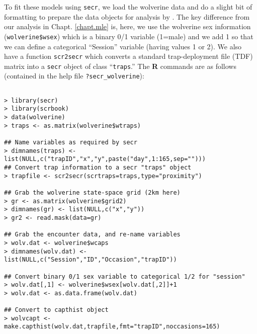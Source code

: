 To fit these models using \mbox{\tt secr}, 
we load the wolverine data and do 
a slight bit of formatting to prepare the data objects for analysis by
\mbox{\secr}. The key difference from our analysis in
Chapt. \ref{chapt.mle} is, here, we use the wolverine sex information
(\mbox{\tt wolverine\$wsex}) which is a binary 0/1 variable (1=male) 
and we add
1 so that we can define a categorical  ``Session'' variable (having
values 1 or 2). We also have a function \mbox{\tt scr2secr} which
converts a standard trap-deployment file (TDF) matrix into a \mbox{\tt secr}
object of class ``\mbox{\tt traps}.''
The {\bf R} commands are as follows (contained in the help file
\mbox{\tt ?secr\_wolverine}): 
{\small
\begin{verbatim}

> library(secr)
> library(scrbook)
> data(wolverine)
> traps <- as.matrix(wolverine$wtraps)

## Name variables as required by secr
> dimnames(traps) <- list(NULL,c("trapID","x","y",paste("day",1:165,sep="")))
## Convert trap information to a secr "traps" object
> trapfile <- scr2secr(scrtraps=traps,type="proximity")

## Grab the wolverine state-space grid (2km here)
> gr <- as.matrix(wolverine$grid2)
> dimnames(gr) <- list(NULL,c("x","y"))
> gr2 <- read.mask(data=gr)

## Grab the encounter data, and re-name variables
> wolv.dat <- wolverine$wcaps
> dimnames(wolv.dat) <- list(NULL,c("Session","ID","Occasion","trapID"))

## Convert binary 0/1 sex variable to categorical 1/2 for "session"
> wolv.dat[,1] <- wolverine$wsex[wolv.dat[,2]]+1
> wolv.dat <- as.data.frame(wolv.dat)

## Convert to capthist object
> wolvcapt <- make.capthist(wolv.dat,trapfile,fmt="trapID",noccasions=165)
\end{verbatim}
}


